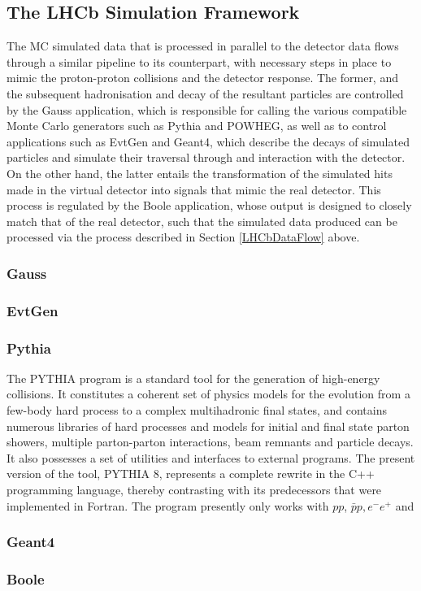 \subsection{The LHCb Simulation Framework}
The MC simulated data that is processed in parallel to the detector data flows through a similar pipeline to its counterpart, with necessary steps in place to mimic the proton-proton collisions and the detector response. The former, and the subsequent hadronisation and decay of the resultant particles 
are controlled by the Gauss application, which is responsible for calling the various compatible Monte Carlo generators such as Pythia and POWHEG, as well as to control applications such as EvtGen and Geant4, which describe the decays of simulated particles and simulate their traversal through and interaction with
the detector. On the other hand, the latter entails the transformation of the simulated hits made in the virtual detector into signals that mimic the real detector. This process is regulated by the Boole application, whose output is designed to closely match that of the real detector, such that the simulated data produced can be 
processed via the process described in Section \ref{LHCbDataFlow} above. 
\subsubsection{Gauss}

\subsubsection{EvtGen}
\subsubsection{Pythia}
The PYTHIA program is a standard tool for the generation of high-energy collisions. It constitutes a coherent set of
physics models for the evolution from a few-body hard process to a complex multihadronic final states, and contains numerous libraries of 
hard processes and models for initial and final state parton showers, multiple parton-parton interactions, beam remnants and particle decays. It 
also possesses a set of utilities and interfaces to external programs. The present version of the tool, PYTHIA 8, represents a complete rewrite in the C++ programming language, thereby contrasting
with its predecessors that were implemented in Fortran. The program presently only works with $pp$, $\bar{p}p, e^{-}e^{+}$ and 
\subsubsection{Geant4}
\subsubsection{Boole} 



